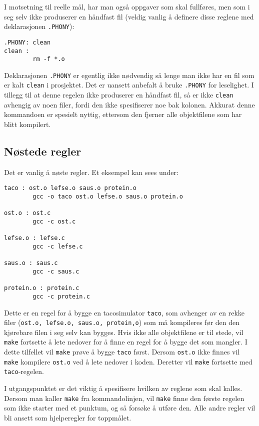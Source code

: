 \begin{alphasection}
I motsetning til reelle mål, har man også oppgaver som skal fullføres, men som i seg selv ikke produserer en håndfast fil (veldig vanlig å definere disse reglene med deklarasjonen \verb|.PHONY|):
\\
\begin{verbatim}
.PHONY: clean
clean :
        rm -f *.o
\end{verbatim}


Deklarasjonen \verb|.PHONY| er egentlig ikke nødvendig så lenge man ikke har en fil som er kalt \verb|clean| i prosjektet. Det er uansett anbefalt å bruke \verb|.PHONY| for leselighet. I tillegg til at denne regelen ikke produserer en håndfast fil, så er ikke \verb|clean| avhengig av noen filer, fordi den ikke spesifiserer noe bak kolonen. Akkurat denne kommandoen er spesielt nyttig, ettersom den fjerner alle objektfilene som har blitt kompilert. 

\subsection{Nøstede regler}

Det er vanlig å nøste regler. Et eksempel kan sees under:

\begin{lstlisting}
taco : ost.o lefse.o saus.o protein.o
        gcc -o taco ost.o lefse.o saus.o protein.o

ost.o : ost.c
        gcc -c ost.c

lefse.o : lefse.c
        gcc -c lefse.c

saus.o : saus.c
        gcc -c saus.c

protein.o : protein.c
        gcc -c protein.c
\end{lstlisting}

Dette er en regel for å bygge en tacosimulator \verb|taco|, som avhenger av en rekke filer (\verb|ost.o, lefse.o, saus.o, protein,o|) som må kompileres før den den kjørebare filen i seg selv kan bygges. Hvis ikke alle objektfilene er til stede, vil \verb|make| fortsette å lete nedover for å finne en regel for å bygge det som mangler. I dette tilfellet vil \verb|make| prøve å bygge \verb|taco| først. Dersom \verb|ost.o| ikke finnes vil \verb|make| kompilere \verb|ost.o| ved å lete nedover i koden. Deretter vil \verb|make| fortsette med \verb|taco|-regelen.

I utgangspunktet er det viktig å spesifisere hvilken av reglene som skal kalles. Dersom man kaller \verb|make| fra kommandolinjen, vil \verb|make| finne den første regelen
som ikke starter med et punktum, og så forsøke å utføre den. Alle andre
regler vil bli ansett som hjelperegler for toppmålet.


\end{alphasection}
